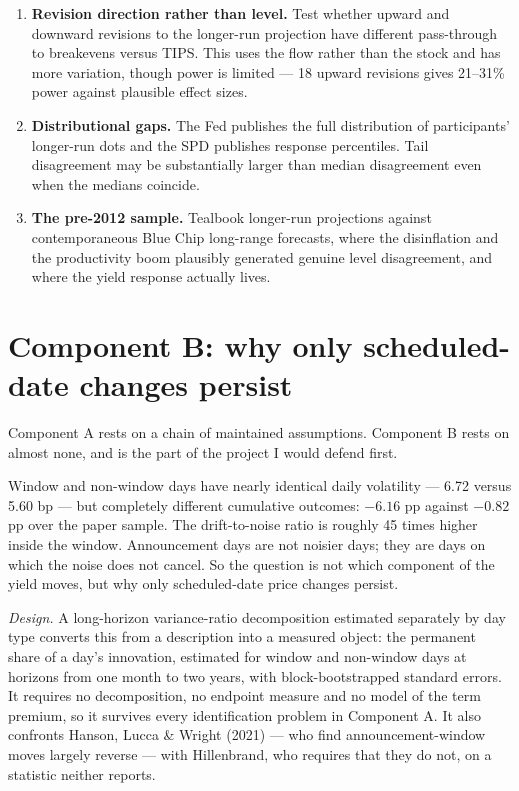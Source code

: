 \documentclass[11pt]{article}
\begin{document}
\begin{enumerate}\setlength\itemsep{0.15em}
\item \textbf{Revision direction rather than level.} Test whether upward and downward revisions
to the longer-run projection have different pass-through to breakevens versus TIPS. This uses
the flow rather than the stock and has more variation, though power is limited --- 18 upward
revisions gives 21--31\% power against plausible effect sizes.
\item \textbf{Distributional gaps.} The Fed publishes the full distribution of participants'
longer-run dots and the SPD publishes response percentiles. Tail disagreement may be
substantially larger than median disagreement even when the medians coincide.
\item \textbf{The pre-2012 sample.} Tealbook longer-run projections against contemporaneous
Blue Chip long-range forecasts, where the disinflation and the productivity boom plausibly
generated genuine level disagreement, and where the yield response actually lives.
\end{enumerate}

\section{Component B: why only scheduled-date changes persist}

Component A rests on a chain of maintained assumptions. Component B rests on almost none, and
is the part of the project I would defend first.

Window and non-window days have nearly identical daily volatility --- 6.72 versus 5.60 bp ---
but completely different cumulative outcomes: $-6.16$ pp against $-0.82$ pp over the paper
sample. The drift-to-noise ratio is roughly 45 times higher inside the window. Announcement
days are not noisier days; they are days on which the noise does not cancel. So the question
is not which component of the yield moves, but why only scheduled-date price changes persist.

\emph{Design.} A long-horizon variance-ratio decomposition estimated separately by day type
converts this from a description into a measured object: the permanent share of a day's
innovation, estimated for window and non-window days at horizons from one month to two years,
with block-bootstrapped standard errors. It requires no decomposition, no endpoint measure and
no model of the term premium, so it survives every identification problem in Component A. It
also confronts Hanson, Lucca \& Wright (2021) --- who find announcement-window moves largely
reverse --- with Hillenbrand, who requires that they do not, on a statistic neither reports.
\end{document}
